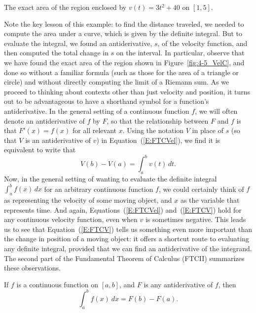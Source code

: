\begin{marginfigure}[2in] %
\caption{The exact area of the region enclosed by $v(t) = 3t^2 + 40$ on $[1,5]$.} \label{fig:4-5_VelC}
\end{marginfigure}

Note the key lesson of this example:  to find the distance traveled, we needed to compute the area under a curve, which is given by the definite integral.  But to evaluate the integral, we found an antiderivative, $s$, of the velocity function, and then computed the total change in $s$ on the interval.  In particular, observe that we have found the exact area of the region shown in Figure~\ref{fig:4-5_VelC}, and done so without a familiar formula (such as those for the area of a triangle or circle) and without directly computing the limit of a Riemann sum. As we proceed to thinking about contexts other than just velocity and position, it turns out to be advantageous to have a shorthand symbol for a function's antiderivative.  In the general setting of a continuous function $f$, we will often denote an antiderivative of $f$ by $F$, so that the relationship between $F$ and $f$ is that $F'(x) = f(x)$ for all relevant $x$.  Using the notation $V$ in place of $s$ (so that $V$ is an antiderivative of $v$) in Equation~(\ref{E:FTCVel}), we find it is equivalent to write that
\begin{equation} \label{E:FTCV} %
V(b) - V(a) = \int_a^b v(t) \, dt.
\end{equation}
 Now, in the general setting of wanting to evaluate the definite integral $\int_a^b f(x) \, dx$ for an arbitrary continuous function $f$, we could certainly think of $f$ as representing the velocity of some moving object, and $x$ as the variable that represents time.  And again, Equations~(\ref{E:FTCVel}) and~(\ref{E:FTCV}) hold for any continuous velocity function, even when $v$ is sometimes negative.   This leads us to see that Equation~(\ref{E:FTCV}) tells us something even more important than the change in position of a moving object: it offers a shortcut route to evaluating any definite integral, provided that we can find an antiderivative of the integrand.  The second part of the Fundamental Theorem of Calculus (FTCII)  summarizes these observations.
 
{If $f$ is a continuous function on $[a,b]$, and $F$ is any antiderivative of $f$, then
\[ \int_a^b f(x) \ dx = F(b) - F(a). \]
} %

